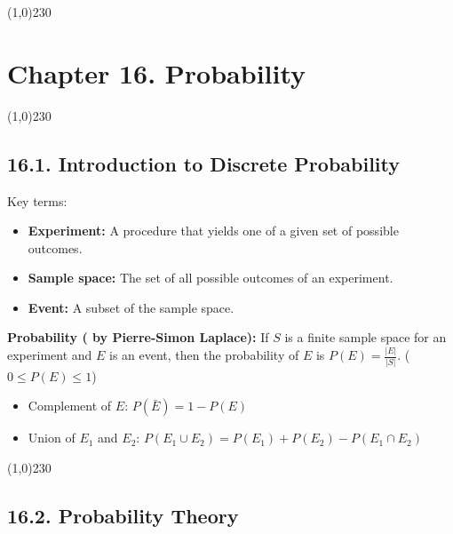 
\begin{center}
\line(1,0){230}
\end{center}

\section*{Chapter 16. Probability}

\begin{center}
\line(1,0){230}
\end{center}

\subsection*{16.1. Introduction to Discrete Probability}

Key terms:
\begin{itemize}
    \item \textbf{Experiment: } A procedure that yields one of a given set of possible outcomes.
    \item \textbf{Sample space: } The set of all possible outcomes of an experiment.
    \item \textbf{Event: } A subset of the sample space.
\end{itemize}

\begin{definition}
    \textbf{Probability ( by Pierre-Simon Laplace): } If $S$ is a finite  sample space for an experiment and $E$ is an event, then the probability of $E$ is $P(E) = \frac{|E|}{|S|}$. ($0 \le P(E) \le 1$)
\end{definition}

\begin{itemize}
    \item Complement of $E$: $P(\bar E) = 1 - P(E)$
    \item Union of $E_1$ and $E_2$: $P(E_1 \cup E_2) = P(E_1) + P(E_2) - P(E_1 \cap E_2)$
\end{itemize}

\begin{center}
\line(1,0){230}
\end{center}

\subsection*{16.2. Probability Theory}

